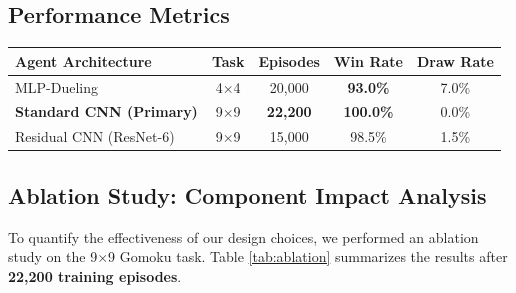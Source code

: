 \documentclass[9pt,a4paper,twocolumn,twoside]{rho-class/rho}
\begin{document}
    \subsection{Performance Metrics}
        \begin{center}
            \begin{tabular}{lcccc}
                \toprule
                Agent Architecture & Task & Episodes & Win Rate & Draw Rate \\
                \midrule
                MLP-Dueling & 4$\times$4 & 20,000 & \textbf{93.0\%} & 7.0\% \\
                \textbf{Standard CNN (Primary)} & 9$\times$9 & \textbf{22,200} & \textbf{100.0\%} & 0.0\% \\
                Residual CNN (ResNet-6) & 9$\times$9 & 15,000 & 98.5\% & 1.5\% \\
                \bottomrule
            \end{tabular}
        \end{center}

    \subsection{Ablation Study: Component Impact Analysis}
        To quantify the effectiveness of our design choices, we performed an ablation study on the 9$\times$9 Gomoku task. Table \ref{tab:ablation} summarizes the results after \textbf{22,200 training episodes}.
        
        \begin{table}[h]
            \centering
            \caption{Ablation analysis demonstrating the critical role of each architectural component.}
            \label{tab:ablation}
        \end{table}
\end{document}
